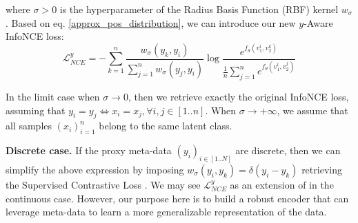 \documentclass[runningheads]{llncs}
\newcommand{\PG}[1]{\textcolor{magenta}{#1}}
\begin{document}
where $\sigma > 0$ is the hyperparameter of the Radius Basis Function (RBF) kernel $w_\sigma$. 
Based on eq. \ref{approx_pos_distribution}, we can introduce our new $y$-Aware InfoNCE loss:
\begin{equation}
\label{y_aware_infoNCE_loss}
    \mathcal{L}^{y}_{NCE} = -\sum_{k=1}^{n}\frac{w_\sigma(y_k, y_i)}{\sum_{j=1}^n w_\sigma(y_j, y_i)}\log\frac{e^{f_\theta(v_1^i, v_2^k)}}{\frac{1}{n}\sum_{j=1}^n e^{f_\theta(v_1^i, v_2^j)}}
\end{equation}

In the limit case when $\sigma \rightarrow 0$, then we retrieve exactly the original InfoNCE loss, assuming that $y_i=y_j \Leftrightarrow x_i = x_j, \forall i, j \in [1..n]$. When $\sigma \rightarrow +\infty$, we assume that all samples $(x_i)_{i=1}^n$ belong to the same latent class.

\textbf{Discrete case.} If the proxy meta-data $(y_i)_{i\in [1..N]}$ are discrete, then we can simplify the above expression by imposing $w_\sigma(y_i, y_k) = \delta(y_i-y_k)$ retrieving the Supervised Contrastive Loss \cite{khosla2020}. We may see $\mathcal{L}^y_{NCE}$ as an extension of \cite{khosla2020} in the continuous case. However, our purpose here is to build a robust  encoder that can leverage meta-data to learn a more generalizable representation of the data.
\end{document}
